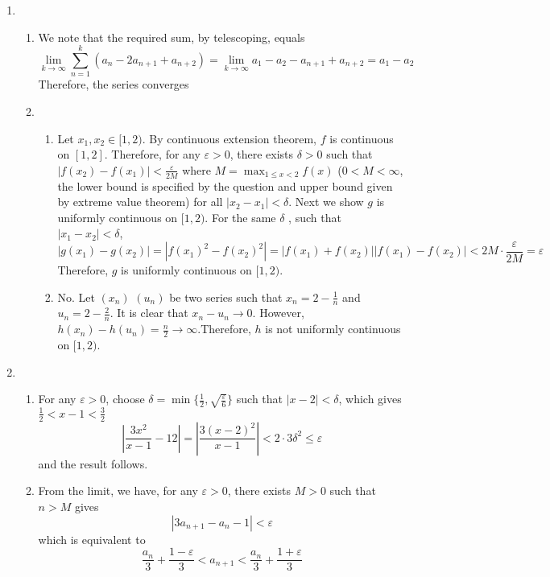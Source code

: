 \documentclass[12pt]{article}
\theoremstyle{definition}
\begin{document}
\begin{enumerate}
\begin{enumerate}
  \[
m=\frac{4}{\frac{1}{m}+\frac{2}{m}+\frac{1}{m}}\leq \frac{4}{\frac{1}{f(x_1)}+\frac{2}{f(x_2)}+\frac{1}{f(x_3)}}\leq \frac{4}{\frac{1}{M}+\frac{2}{M}+\frac{1}{M}}=M
  \]
  And by intermediate value theorem, we have our $c$. 
  \end{enumerate}
  \item\begin{enumerate}
  \item We note that the required sum, by telescoping, equals
  \[
\lim_{k\to\infty}\sum_{n=1}^k (a_n-2a_{n+1}+a_{n+2})=\lim_{k\to\infty}{a_1-a_2-a_{n+1}+a_{n+2}}=a_1-a_2
  \]
  Therefore, the series converges
  \item
  \begin{enumerate}
    \item Let $x_1,x_2\in[1,2)$. By continuous extension theorem, $f$ is continuous on $[1,2]$. Therefore, for any $\varepsilon>0$, there exists $\delta>0$ such that $|f(x_2)-f(x_1)|<\frac{\varepsilon}{2M}$ where $M=\max_{1\leq x<2}f(x)$ ($0<M <\infty$, the lower bound is specified by the question and upper bound given by extreme value theorem) for all $|x_2-x_1|<\delta$. Next we show $g$ is uniformly continuous on $[1,2)$. For the same  $\delta$ , such that $|x_1-x_2|<\delta$,
    \[
|g(x_1)-g(x_2)|=|f(x_1)^2-f(x_2)^2| = |f(x_1)+f(x_2)||f(x_1)-f(x_2)|<2M\cdot\frac{\varepsilon}{2M}=\varepsilon
    \]
    Therefore, $g$ is uniformly continuous on $[1,2)$.
    \item No. Let $(x_n)$ $(u_n)$ be two series such that $x_n = 2-\frac{1}{n}$ and $u_n = 2-\frac{2}{n}$. It is clear that $x_n-u_n\to 0$. However, $h(x_n)-h(u_n)=\frac{n}{2}\to\infty$.Therefore, $h$ is not uniformly continuous on $[1,2)$.  
  \end{enumerate}
  \end{enumerate}
  \item\begin{enumerate}
  \item For any $\varepsilon>0$, choose $\delta = \min\{\frac{1}{2},\sqrt{\frac{\varepsilon}{6}}\}$ such that $|x-2|<\delta$, which gives $\frac{1}{2}<x-1<\frac{3}{2}$
  \[
\left|\frac{3x^2}{x-1}-12\right| = \left|\frac{3(x-2)^2}{x-1}\right|<2\cdot3\delta^2\leq\varepsilon
  \]
  and the result follows.
  \item From the limit, we have, for any $\varepsilon>0$, there exists $M>0$ such that $n>M$ gives
  \[
|3a_{n+1}-a_n-1|<\varepsilon
  \]
  which is equivalent to 
  \[
\frac{a_n}{3}+\frac{1-\varepsilon}{3}<a_{n+1}<\frac{a_n}{3}+\frac{1+\varepsilon}{3}
  \]

\end{enumerate}
\end{enumerate}
\end{document}
